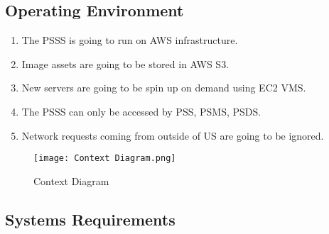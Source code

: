 \subsection{Operating Environment}
\begin{enumerate}[label=OE-\arabic*]
    \item The PSSS is going to run on AWS infrastructure.
    \item Image assets are going to be stored in AWS S3.
    \item New servers are going to be spin up on demand using EC2 VMS.
    \item The PSSS can only be accessed by PSS, PSMS, PSDS.
    \item Network requests coming from outside of US are going to be ignored.
\end{enumerate}
\begin{figure}[!htb]
    \centering
    \texttt{[image: Context Diagram.png]}
    \caption{Context Diagram}
\end{figure}
\pagebreak 
\subsection{Systems Requirements}
